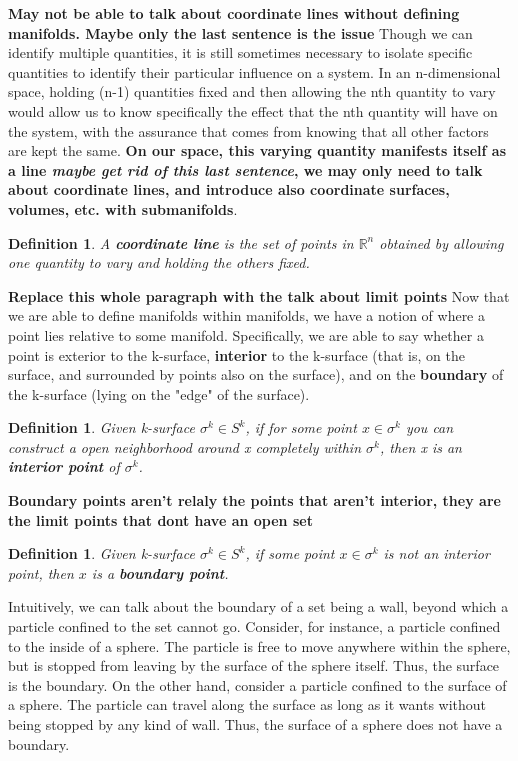 \documentclass{book}
\newtheorem{defn}[equation]{Definition}
\begin{document}
\textbf{May not be able to talk about coordinate lines without defining manifolds. Maybe only the last sentence is the issue}
Though we can identify multiple quantities, it is still sometimes necessary to isolate specific quantities to identify their particular influence on a system. In an n-dimensional space, holding (n-1) quantities fixed and then allowing the nth quantity to vary would allow us to know specifically the effect that the nth quantity will have on the system, with the assurance that comes from knowing that all other factors are kept the same. \textbf{On our space, this varying quantity manifests itself as a line \textit{maybe get rid of this last sentence}, we may only need to talk about coordinate lines, and introduce also coordinate surfaces, volumes, etc. with submanifolds}. 

\begin{defn}
	A \textbf{coordinate line} is the set of points in $\mathbb{R}^n$ obtained by allowing one quantity to vary and holding the others fixed. 
\end{defn}

\textbf{Replace this whole paragraph with the talk about limit points}
Now that we are able to define manifolds within manifolds, we have a notion of where a point lies relative to some manifold. Specifically, we are able to say whether a point is exterior to the k-surface, \textbf{interior} to the k-surface (that is, on the surface, and surrounded by points also on the surface), and on the \textbf{boundary} of the k-surface (lying on the "edge" of the surface).  


\begin{defn}
	Given k-surface $\sigma^k \in S^k$, if for some point $x \in \sigma^k$ you can construct a open neighborhood around x completely within $\sigma^k$, then x is an \textbf{interior point} of $\sigma^k$. 
\end{defn}


\textbf{Boundary points aren't relaly the points that aren't interior, they are the limit points that dont have an open set}
\begin{defn}
	Given k-surface $\sigma^k \in S^k$, if some point $x \in \sigma^k$ is not an interior point, then $x$ is a \textbf{boundary point}.
\end{defn}

Intuitively, we can talk about the boundary of a set being a wall, beyond which a particle confined to the set cannot go. Consider, for instance, a particle confined to the inside of a sphere. The particle is free to move anywhere within the sphere, but is stopped from leaving by the surface of the sphere itself. Thus, the surface is the boundary. On the other hand, consider a particle confined to the surface of a sphere. The particle can travel along the surface as long as it wants without being stopped by any kind of wall. Thus, the surface of a sphere does not have a boundary. 
\end{document}
